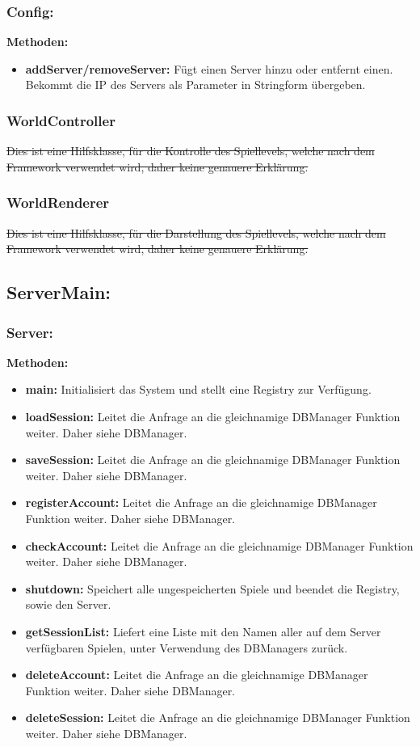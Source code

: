 \documentclass[fontsize=12pt,paper=a4,twoside]{scrartcl}
\begin{document}
\subsubsection{Config:}
\textbf{Methoden:}
\begin{itemize}
	\item \textbf{addServer/removeServer:} Fügt einen Server hinzu oder entfernt einen. Bekommt die IP des Servers als Parameter in Stringform übergeben.
\end{itemize}

\subsubsection{WorldController}

\sout{Dies ist eine Hilfsklasse, für die Kontrolle des Spiellevels, welche nach dem Framework verwendet wird, daher keine genauere Erklärung.}

\subsubsection{WorldRenderer}

\sout{Dies ist eine Hilfsklasse, für die Darstellung des Spiellevels, welche nach dem Framework verwendet wird, daher keine genauere Erklärung.}

\subsection{ServerMain:}
\subsubsection{Server:}
\textbf{Methoden:}
\begin{itemize}
	\item \textbf{main:} Initialisiert das System und stellt eine Registry zur Verfügung.
	\item \textbf{loadSession:} Leitet die Anfrage an die gleichnamige DBManager Funktion weiter. Daher siehe DBManager.
	\item \textbf{saveSession:} Leitet die Anfrage an die gleichnamige DBManager Funktion weiter. Daher siehe DBManager.
	\item \textbf{registerAccount:} Leitet die Anfrage an die gleichnamige DBManager Funktion weiter. Daher siehe DBManager.
	\item \textbf{checkAccount:} Leitet die Anfrage an die gleichnamige DBManager Funktion weiter. Daher siehe DBManager.
	\item \textbf{shutdown:} Speichert alle ungespeicherten Spiele und beendet die Registry, sowie den Server.
	\item \textbf{getSessionList:} Liefert eine Liste mit den Namen aller auf dem Server verfügbaren Spielen, unter Verwendung des DBManagers zurück.
	\item \textbf{deleteAccount:} Leitet die Anfrage an die gleichnamige DBManager Funktion weiter. Daher siehe DBManager.
	\item \textbf{deleteSession:} Leitet die Anfrage an die gleichnamige DBManager Funktion weiter. Daher siehe DBManager.
\end{itemize}
\end{document}
